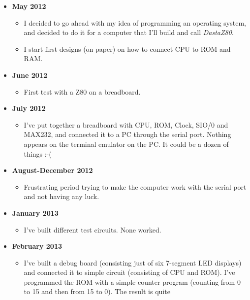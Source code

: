 \documentclass[a4paper,11pt]{article}
\begin{document}
    \begin{itemize}
        \item \textbf{May 2012}
        \begin{itemize}
            \item I decided to go ahead with my idea of programming an operating
            system, and decided to do it for a computer that I'll build and call
            \textit{DastaZ80}.
            \item I start first designs (on paper) on how to connect CPU to ROM
            and RAM.
        \end{itemize}
        \item \textbf{June 2012}
        \begin{itemize}
            \item First test with a Z80 on a breadboard.
        \end{itemize}
        \item \textbf{July 2012}
        \begin{itemize}
            \item I've put together a breadboard with CPU, ROM, Clock, SIO/0 and
            MAX232, and connected it to a PC through the serial port. Nothing
            appears on the terminal emulator on the PC. It could be a dozen of
            things :-(
        \end{itemize}
        \item \textbf{August-December 2012}
        \begin{itemize}
            \item Frustrating period trying to make the computer work with the
            serial port and not having any luck.
        \end{itemize}
        \item \textbf{January 2013}
        \begin{itemize}
            \item I've built different test circuits. None worked.
        \end{itemize}
        \item \textbf{February 2013}
        \begin{itemize}
            \item I've built a debug board (consisting just of six 7-segment LED
            displays) and connected it to simple circuit (consisting of CPU and
            ROM). I've programmed the ROM with a simple counter program
            (counting from 0 to 15 and then from 15 to 0). The result is quite

\end{itemize}
\end{itemize}
\end{document}
